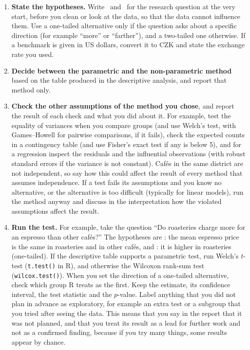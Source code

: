 \documentclass[11pt,a4paper]{article}
\begin{document}
\begin{enumerate}
	\item \textbf{State the hypotheses.} Write \Ho\ and \Hone\ for the research question at the very start, before you clean or look at the data, so that the data cannot influence them. Use a one-tailed alternative only if the question asks about a specific direction (for example ``more'' or ``farther''), and a two-tailed one otherwise. If a benchmark is given in US dollars, convert it to CZK and state the exchange rate you used.
	\item \textbf{Decide between the parametric and the non-parametric method} based on the table produced in the descriptive analysis, and report that method only.
	\item \textbf{Check the other assumptions of the method you chose}, and report the result of each check and what you did about it. For example, test the equality of variances when you compare groups (and use Welch's test, with Games--Howell for pairwise comparisons, if it fails), check the expected counts in a contingency table (and use Fisher's exact test if any is below 5), and for a regression inspect the residuals and the influential observations (with robust standard errors if the variance is not constant). Caf\'es in the same district are not independent, so say how this could affect the result of every method that assumes independence. If a test fails its assumptions and you know no alternative, or the alternative is too difficult (typically for linear models), run the method anyway and discuss in the interpretation how the violated assumptions affect the result.
	\item \textbf{Run the test.} For example, take the question ``Do roasteries charge more for an espresso than other caf\'es?'' The hypotheses are \Ho: the mean espresso price is the same in roasteries and in other caf\'es, and \Hone: it is higher in roasteries (one-tailed). If the descriptive table supports a parametric test, run Welch's $t$-test (\texttt{t.test()} in R), and otherwise the Wilcoxon rank-sum test (\texttt{wilcox.test()}). When you set the direction of a one-tailed alternative, check which group R treats as the first. Keep the estimate, its confidence interval, the test statistic and the $p$-value. Label anything that you did not plan in advance as exploratory, for example an extra test or a subgroup that you tried after seeing the data. This means that you say in the report that it was not planned, and that you treat its result as a lead for further work and not as a confirmed finding, because if you try many things, some results appear by chance.

\end{enumerate}
\end{document}
